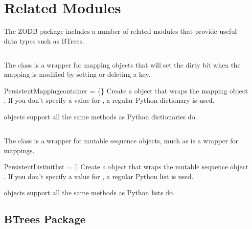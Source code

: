 
\section{Related Modules}

The ZODB package includes a number of related modules that provide
useful data types such as BTrees.

\subsection{}

The  class is a wrapper for mapping objects
that will set the dirty bit when the mapping is modified by setting or
deleting a key.

\begin{funcdesc}{PersistentMapping}{container = \{\}}
Create a  object that wraps the
mapping object .  If you don't specify a
value for , a regular Python dictionary is used.
\end{funcdesc}

 objects support all the same methods as
Python dictionaries do.

\subsection{}

The  class is a wrapper for mutable sequence objects,
much as  is a wrapper for mappings.

\begin{funcdesc}{PersistentList}{initlist = []}
Create a  object that wraps the
mutable sequence object .  If you don't specify a
value for , a regular Python list is used.
\end{funcdesc}

 objects support all the same methods as
Python lists do.


\subsection{BTrees Package}

